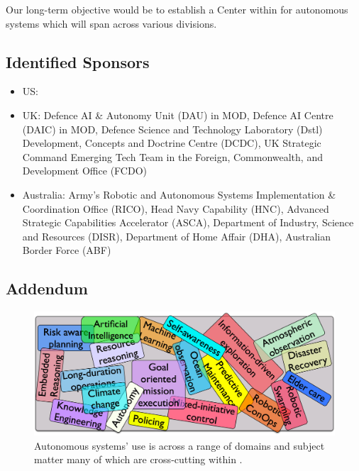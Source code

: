 \documentclass[11pt,letterpaper]{article}
\begin{document}
Our long-term objective would be to establish a Center within \org for
autonomous systems which will span across various divisions.

\subsection{Identified Sponsors}

\begin{itemize}

\item US:

\item UK: Defence AI \& Autonomy Unit (DAU) in MOD, Defence AI Centre
  (DAIC) in MOD, Defence Science and Technology Laboratory (Dstl)
  Development, Concepts and Doctrine Centre (DCDC), UK Strategic
  Command Emerging Tech Team in the Foreign, Commonwealth, and
  Development Office (FCDO)

\item Australia: Army's Robotic and Autonomous Systems Implementation
  \& Coordination Office (RICO), Head Navy Capability (HNC), Advanced
  Strategic Capabilities Accelerator (ASCA), Department of Industry,
  Science and Resources (DISR), Department of Home Affair (DHA),
  Australian Border Force (ABF)

\end{itemize}

\pagebreak

\subsection{Addendum}

\begin{figure}
  \vspace{-0.5cm}
  \centering
  \includegraphics[scale=0.06]{fig/word-bag.jpg}
  \caption{Autonomous systems' use is across a range of domains and
    subject matter many of which are cross-cutting within \orge.}
 \label{fig:topics}
\end{figure}
\end{document}
